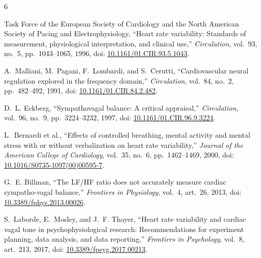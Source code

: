 \documentclass[11pt,a4paper]{article}
\begin{document}

\begin{thebibliography}{6}
\setlength{\itemsep}{0.15em}

Task Force of the European Society of Cardiology and the North American
Society of Pacing and Electrophysiology,
``Heart rate variability: Standards of measurement, physiological
interpretation, and clinical use,''
\emph{Circulation}, vol.~93, no.~5, pp.~1043--1065, 1996,
doi: \href{https://doi.org/10.1161/01.CIR.93.5.1043}{10.1161/01.CIR.93.5.1043}.

A.~Malliani, M.~Pagani, F.~Lombardi, and S.~Cerutti,
``Cardiovascular neural regulation explored in the frequency domain,''
\emph{Circulation}, vol.~84, no.~2, pp.~482--492, 1991,
doi: \href{https://doi.org/10.1161/01.CIR.84.2.482}{10.1161/01.CIR.84.2.482}.

D.~L. Eckberg,
``Sympathovagal balance: A critical appraisal,''
\emph{Circulation}, vol.~96, no.~9, pp.~3224--3232, 1997,
doi: \href{https://doi.org/10.1161/01.CIR.96.9.3224}{10.1161/01.CIR.96.9.3224}.

L.~Bernardi et al.,
``Effects of controlled breathing, mental activity and mental stress with or
without verbalization on heart rate variability,''
\emph{Journal of the American College of Cardiology}, vol.~35, no.~6,
pp.~1462--1469, 2000,
doi: \href{https://doi.org/10.1016/S0735-1097(00)00595-7}{10.1016/S0735-1097(00)00595-7}.

G.~E. Billman,
``The LF/HF ratio does not accurately measure cardiac sympatho-vagal
balance,''
\emph{Frontiers in Physiology}, vol.~4, art.~26, 2013,
doi: \href{https://doi.org/10.3389/fphys.2013.00026}{10.3389/fphys.2013.00026}.

S.~Laborde, E.~Mosley, and J.~F. Thayer,
``Heart rate variability and cardiac vagal tone in psychophysiological
research: Recommendations for experiment planning, data analysis, and data
reporting,''
\emph{Frontiers in Psychology}, vol.~8, art.~213, 2017,
doi: \href{https://doi.org/10.3389/fpsyg.2017.00213}{10.3389/fpsyg.2017.00213}.

\end{thebibliography}
\end{document}
